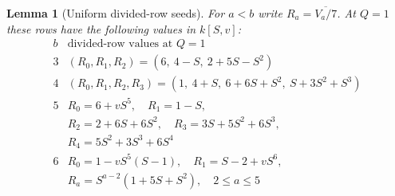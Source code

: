 \documentclass[11pt]{article}
\newtheorem{lemma}{Lemma}
\begin{document}
\begin{lemma}[Uniform divided-row seeds]\label{lem:divided-seeds}
For $a<b$ write $R_a=\overline{V_a/7}$.
At $Q=1$ these rows have the following values in $k[S,v]$:
\[
\begin{array}{c|l}
 b&\text{divided-row values at }Q=1\\\hline
3&(R_0,R_1,R_2)=(6,\ 4-S,\ 2+5S-S^2)\\
4&(R_0,R_1,R_2,R_3)=(1,\ 4+S,\ 6+6S+S^2,\ S+3S^2+S^3)\\
5&R_0=6+vS^5,\quad R_1=1-S,\\
 &R_2=2+6S+6S^2,\quad R_3=3S+5S^2+6S^3,\\
 &R_4=5S^2+3S^3+6S^4\\
6&R_0=1-vS^5(S-1),\quad R_1=S-2+vS^6,\\
 &R_a=S^{a-2}(1+5S+S^2),\quad 2\le a\le5
\end{array}                                                     \tag{4}
\]
\end{lemma}
\end{document}
